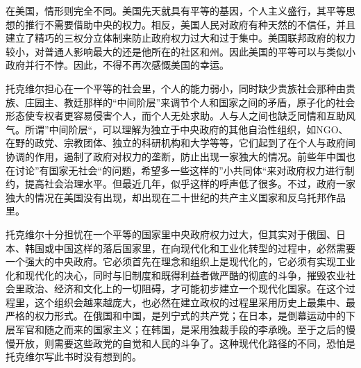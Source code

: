 在美国，情形则完全不同。美国先天就具有平等的基因，个人主义盛行，其平等思想的推行不需要借助中央的权力。相反，美国人民对政府有种天然的不信任，并且建立了精巧的三权分立体制来防止政府权力过大和过于集中。美国联邦政府的权力较小，对普通人影响最大的还是他所在的社区和州。因此美国的平等可以与类似小政府并行不悖。因此，不得不再次感慨美国的幸运。

托克维尔担心在一个平等的社会里，个人的能力弱小，同时缺少贵族社会那种由贵族、庄园主、教廷那样的“中间阶层”来调节个人和国家之间的矛盾，原子化的社会形态使专权者更容易侵害个人，而个人无处求助。人与人之间也缺乏同情和互助风气。所谓”中间阶层“，可以理解为独立于中央政府的其他自治性组织，如NGO、在野的政党、宗教团体、独立的科研机构和大学等等，它们起到了在个人与政府间协调的作用，遏制了政府对权力的垄断，防止出现一家独大的情况。前些年中国也在讨论”有国家无社会“的问题，希望多一些这样的”小共同体“来对政府权力进行制约，提高社会治理水平。但最近几年，似乎这样的呼声低了很多。不过，政府一家独大的情况在美国没有出现，却出现在二十世纪的共产主义国家和反乌托邦作品里。

托克维尔十分担忧在一个平等的国家里中央政府权力过大，但其实对于俄国、日本、韩国或中国这样的落后国家里，在向现代化和工业化转型的过程中，必然需要一个强大的中央政府。它必须首先在理念和组织上是现代化的，它必须有实现工业化和现代化的决心，同时与旧制度和既得利益者做严酷的彻底的斗争，摧毁农业社会里政治、经济和文化上的一切阻碍，才可能初步建立一个现代化国家。在这个过程里，这个组织会越来越庞大，也必然在建立政权的过程里采用历史上最集中、最严格的权力形式。在俄国和中国，是列宁式的共产党；在日本，是倒幕运动中的下层军官和随之而来的国家主义；在韩国，是采用独裁手段的李承晚。至于之后的慢慢开放，则需要这些政党的自觉和人民的斗争了。这种现代化路径的不同，恐怕是托克维尔写此书时没有想到的。
